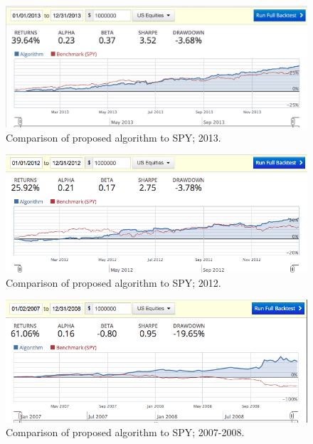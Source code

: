 \documentclass{article}
\begin{document}
\begin{figure}
\includegraphics[scale=0.5,bb=0 0 640 480]{figures/mad_mfd_macd_2013.png}
\caption{Comparison of proposed algorithm to SPY; 2013.}
\label{fig:backtest-2013}
\end{figure}

\begin{figure}
\includegraphics[scale=0.5,bb=0 0 640 480]{figures/mad_mfd_macd_2012.png}
\caption{Comparison of proposed algorithm to SPY; 2012.}
\label{fig:backtest-2012}
\end{figure}

\begin{figure}
\includegraphics[scale=0.5,bb=0 0 640 480]{figures/crash_period_mfd_macd.png}
\caption{Comparison of proposed algorithm to SPY; 2007-2008.}
\label{fig:backtest-2007-2008}
\end{figure}
\end{document}
